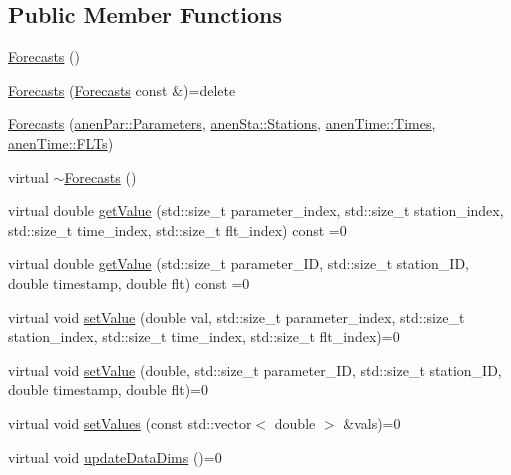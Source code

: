\subsection*{Public Member Functions}
\begin{DoxyCompactItemize}
\item 
\mbox{\hyperlink{class_forecasts_a2614be37bc63171f7d2b9d8b9f9d8871}{Forecasts}} ()
\item 
\mbox{\hyperlink{class_forecasts_a6f47e34b9ae9bb9496149208e3246d65}{Forecasts}} (\mbox{\hyperlink{class_forecasts}{Forecasts}} const \&)=delete
\item 
\mbox{\hyperlink{class_forecasts_a9170f0dd3065f443e19b4280dc2bee2d}{Forecasts}} (\mbox{\hyperlink{classanen_par_1_1_parameters}{anen\+Par\+::\+Parameters}}, \mbox{\hyperlink{classanen_sta_1_1_stations}{anen\+Sta\+::\+Stations}}, \mbox{\hyperlink{classanen_time_1_1_times}{anen\+Time\+::\+Times}}, \mbox{\hyperlink{classanen_time_1_1_f_l_ts}{anen\+Time\+::\+F\+L\+Ts}})
\item 
virtual \mbox{\hyperlink{class_forecasts_a340fd19812d62efc334fe4d23ff8dcd2}{$\sim$\+Forecasts}} ()
\item 
virtual double \mbox{\hyperlink{class_forecasts_a7e6690ba3d8af6ca02d76c6c57701ed4}{get\+Value}} (std\+::size\+\_\+t parameter\+\_\+index, std\+::size\+\_\+t station\+\_\+index, std\+::size\+\_\+t time\+\_\+index, std\+::size\+\_\+t flt\+\_\+index) const =0
\item 
virtual double \mbox{\hyperlink{class_forecasts_a07a51e97b54a5c42d197fb4804ee43bc}{get\+Value}} (std\+::size\+\_\+t parameter\+\_\+\+ID, std\+::size\+\_\+t station\+\_\+\+ID, double timestamp, double flt) const =0
\item 
virtual void \mbox{\hyperlink{class_forecasts_a4ce21957ef296384b1e251098db953bc}{set\+Value}} (double val, std\+::size\+\_\+t parameter\+\_\+index, std\+::size\+\_\+t station\+\_\+index, std\+::size\+\_\+t time\+\_\+index, std\+::size\+\_\+t flt\+\_\+index)=0
\item 
virtual void \mbox{\hyperlink{class_forecasts_a584820dc47f1b5c4cae099485ee59cbe}{set\+Value}} (double, std\+::size\+\_\+t parameter\+\_\+\+ID, std\+::size\+\_\+t station\+\_\+\+ID, double timestamp, double flt)=0
\item 
virtual void \mbox{\hyperlink{class_forecasts_ae2a59385e03dd372fef3dfe89f5a31cf}{set\+Values}} (const std\+::vector$<$ double $>$ \&vals)=0
\item 
virtual void \mbox{\hyperlink{class_forecasts_a8c7d29af8edb5c3bc6a6aad2220506a9}{update\+Data\+Dims}} ()=0

\end{DoxyCompactItemize}
